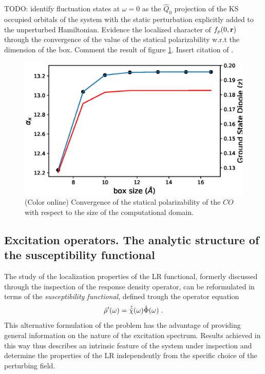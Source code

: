 \documentclass[reprint,aps,prb]{revtex4-1}
\renewcommand{\r}{{\bf r}}
\newcommand{\be}{\begin{equation}}
\newcommand{\ee}{\end{equation}}
\newcommand{\lb}{\label}
\newcommand{\op}[1]{\hat {#1}}
\newcommand{\sop}[1]{\op{\op {#1}}}
\newcommand{\dm}{\op{\rho}}
\begin{document}
\vspace{0.3cm}
TODO: identify fluctuation states at $\omega=0$ as the $\op Q_0$ projection of the KS occupied orbitals of the system with the static perturbation explicitly added to the unperturbed Hamiltonian.
Evidence the localized character of $f_p(0,\r)$ through the convergence of the value of the statical polarizability w.r.t the dimension of the box. Comment the result of figure \ref{co_alphaStatic}.   
Insert citation of \cite{mahan1980}. 

\begin{figure}
\includegraphics[scale=0.56]{CO_alpha+D0_vsBoxSize.eps}
\caption{\label{co_alphaStatic}(Color online) Convergence of the statical polarizability of the $CO$ with respect to the size of the computational domain.}
\end{figure}

\subsection{Excitation operators. The analytic structure of the susceptibility functional} %

The study of the localization properties of the LR functional, formerly discussed through the inspection of the response density operator, can be reformulated in terms of the 
\emph{susceptibility functional}, defined trough the operator equation  
\be\lb{SusceptibilityDef1}
\dm'(\omega) = \sop{{\cal \chi}}(\omega) \op\Phi(\omega) \;. 
\ee
This alternative formulation of the problem has the advantage of providing general information on the nature of the excitation spectrum. Results achieved in this way thus describes an intrinsic 
feature of the system under inspection and determine the properties of the LR independently from the specific choice of the perturbing field. 
\end{document}
